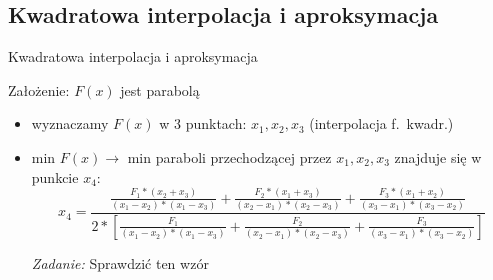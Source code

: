 \subsection{Kwadratowa interpolacja i aproksymacja}
  \begin{frame}{Kwadratowa interpolacja i aproksymacja}
    \begin{block}{Założenie: $F(x)$ jest parabolą}
      \begin{itemize}
        \item wyznaczamy $F(x)$ w 3 punktach: $x_{1}{,}x_{2}{,}x_{3}$
        (interpolacja f.~kwadr.)
        \item min $F(x) \to$ min paraboli przechodzącej przez
        $x_{1}{,}x_{2}{,}x_{3}$ znajduje się w punkcie $x_4$:
        \begin{displaymath}
          x_4 = \frac{
            \frac{F_{1}*(x_{2}+x_{3})}{(x_{1}-x_{2})*(x_{1}-x_{3})} +
            \frac{F_{2}*(x_{1}+x_{3})}{(x_{2}-x_{1})*(x_{2}-x_{3})} +
            \frac{F_{3}*(x_{1}+x_{2})}{(x_{3}-x_{1})*(x_{3}-x_{2})}
          }{2 * \left[
            \frac{F_{1}}{(x_{1}-x_{2})*(x_{1}-x_{3})} +
            \frac{F_{2}}{(x_{2}-x_{1})*(x_{2}-x_{3})} +
            \frac{F_{3}}{(x_{3}-x_{1})*(x_{3}-x_{2})}
          \right]}
        \end{displaymath}
        \begin{flushright}
          \emph{Zadanie:} Sprawdzić ten wzór
        \end{flushright}
      \end{itemize}
    \end{block}
  \end{frame}

